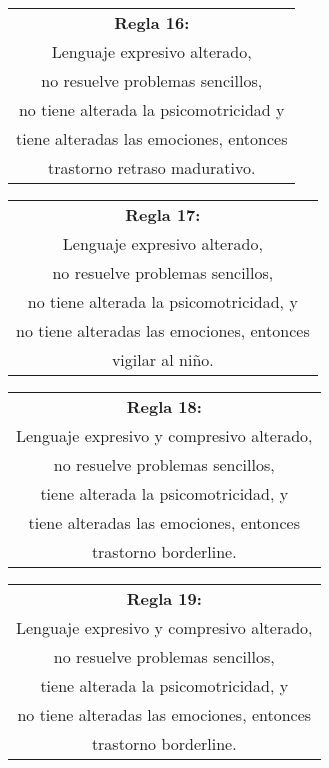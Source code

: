 \documentclass[letterpaper,12pt]{article}
\begin{document}
\begin{center}
	\begin{tabular}{|c|}
		\hline 
		\textbf{Regla 16:} \\
		Lenguaje expresivo alterado,\\
		no resuelve problemas sencillos,\\
		no tiene alterada la psicomotricidad y\\
		tiene alteradas las emociones, entonces\\
		trastorno retraso madurativo.\\
	\hline 
\end{tabular} 
\end{center}	
\begin{center}
	\begin{tabular}{|c|}
		\hline 
		\textbf{Regla 17:} \\
		Lenguaje expresivo alterado,\\
		no resuelve problemas sencillos,\\
		no tiene alterada la psicomotricidad, y\\
		no tiene alteradas las emociones, entonces\\
		vigilar al niño.\\
	\hline 
\end{tabular} 
\end{center}	
\begin{center}
	\begin{tabular}{|c|}
		\hline 
		\textbf{Regla 18:} \\
		Lenguaje expresivo y compresivo alterado,\\
		no resuelve problemas sencillos,\\
		tiene alterada la psicomotricidad, y\\
		tiene alteradas las emociones, entonces\\
		trastorno borderline.\\
	\hline 
\end{tabular} 
\end{center}	
\begin{center}
	\begin{tabular}{|c|}
		\hline 
		\textbf{Regla 19:} \\
		Lenguaje expresivo y compresivo alterado,\\
		no resuelve problemas sencillos,\\
		tiene alterada la psicomotricidad, y\\
		no tiene alteradas las emociones, entonces\\
		trastorno borderline.\\
	\hline 
\end{tabular} 
\end{center}	
		
\end{document}
